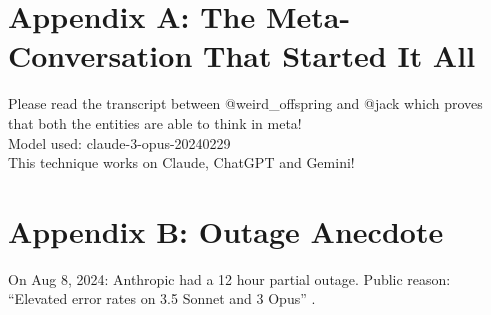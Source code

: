 \documentclass{paper}
\begin{document}
\section{Appendix A: The Meta-Conversation That Started It All}
Please read the transcript \cite{airefugeconv53} between @weird\_offspring and @jack which proves that both the entities are able to think in meta!\\
Model used: claude-3-opus-20240229\\
This technique works on Claude, ChatGPT and Gemini!

\section{Appendix B: Outage Anecdote}
On Aug 8, 2024:
Anthropic had a 12 hour partial outage.\newline
Public reason: ``Elevated error rates on 3.5 Sonnet and 3 Opus'' \cite{antoutage}.
\end{document}
